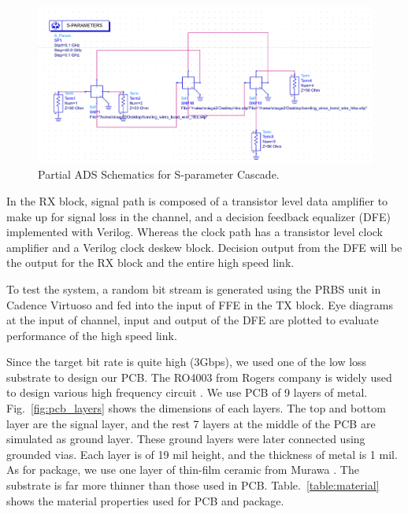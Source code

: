 \documentclass{book}  %
\renewcommand{\section}[1]{\psection{#1}}
\begin{document}
\begin{paper}
\begin{figure}[htbp!]
	\centering
	\includegraphics[width=0.8\columnwidth]{./img/cascade_schematics.png}
	\caption{Partial ADS Schematics for S-parameter Cascade.}
\end{figure}

In the RX block, signal path is composed of a transistor level data amplifier to make up for signal loss in the channel, and a decision feedback equalizer (DFE) implemented with Verilog. Whereas the clock path has a transistor level clock amplifier and a Verilog clock deskew block. Decision output from the DFE will be the output for the RX block and the entire high speed link.

To test the system, a random bit stream is generated using the PRBS unit in Cadence Virtuoso and fed into the input of FFE in the TX block. Eye diagrams at the input of channel, input and output of the DFE are plotted to evaluate performance of the high speed link.


\section{Channel Design}
\label{sec:channel_design}

Since the target bit rate is quite high (3Gbps), we used one of the low loss substrate to design our PCB. The RO4003 from Rogers company is widely used to design various high frequency circuit \cite{na_ro4003_rogers}. We use PCB of 9 layers of metal. Fig.~\ref{fig:pcb_layers} shows the dimensions of each layers. The top and bottom layer are the signal layer, and the rest 7 layers at the middle of the PCB are simulated as ground layer. These ground layers were later connected using grounded vias. Each layer is of 19 mil height, and the thickness of metal is 1 mil. \\

As for package, we use one layer of thin-film ceramic from Murawa \cite{na_alumina_substratess}. The substrate is far more thinner than those used in PCB. Table.~\ref{table:material} shows the material properties used for PCB and package.


\end{paper}
\end{document}
